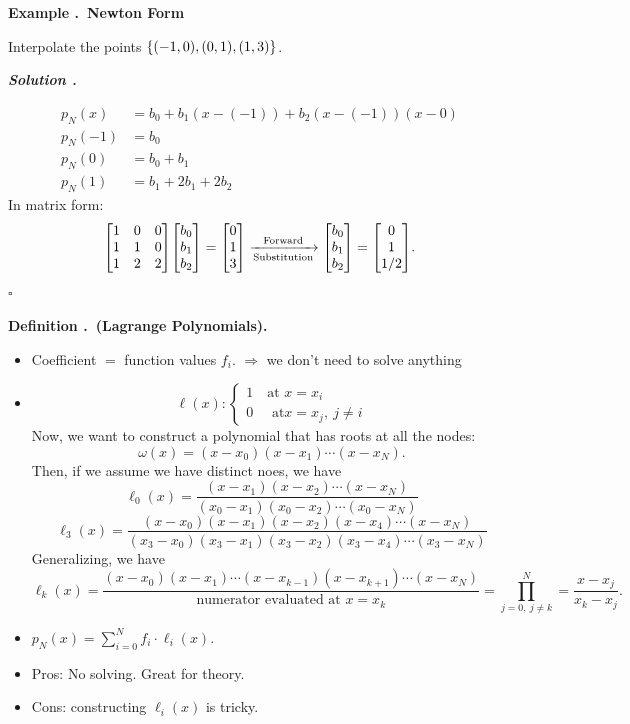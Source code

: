 \documentclass[12pt, a4paper]{article}
\newcounter{index}[subsection]
\newenvironment*{df}[1]{\par\noindent\textbf{Definition \thesubsection.\stepcounter{index}\theindex\ (#1).}}{\par}
\newenvironment*{eg}[1]{\begin{framed}\par\noindent\textbf{Example \thesubsection.\stepcounter{index}\theindex\ #1} \par}{\par\end{framed}}
\newcounter{nprf}[subsection]
\newenvironment*{sol}{\par\indent\textbf{\textit{Solution \stepcounter{nprf}\thenprf.}}\par}{\hfill{$\square$}\par}
\def\dsst{\displaystyle}
\def\l{\ell}
\begin{document}
\begin{eg}{Newton Form}
	Interpolate the points $\qty{(-1,0), (0,1), (1,3)}$.
	\begin{sol}
		\begin{align*}p_N(x)&=b_0+b_1(x-(-1))+b_2(x-(-1))(x-0)\\p_N(-1)&=b_0\\p_N(0)&=b_0+b_1\\p_N(1)&=b_1+2b_1+2b_2\end{align*} In matrix form: \[\mqty[1&0&0\\1&1&0\\1&2&2]\mqty[b_0\\b_1\\b_2]=\mqty[0\\1\\3]\xrightarrow[\text{Substitution}]{\text{Forward}}\mqty[b_0\\b_1\\b_2]=\mqty[0\\1\\1/2].\]
	\end{sol}
\end{eg}
\begin{df}{Lagrange Polynomials}
	\begin{itemize}
		\item Coefficient $=$ function values $f_i$. $\Longrightarrow$ we don't need to solve anything
		\item \[\l(x):\begin{cases}1\quad\text{at }x=x_i\\0\quad\text{ at}x=x_j,\ j\neq i\end{cases}\] Now, we want to construct a polynomial that has roots at all the nodes: \[\omega(x)=(x-x_0)(x-x_1)\cdots(x-x_N).\] Then, if we assume we have distinct noes, we have \[\l_0(x)=\dfrac{(x-x_1)(x-x_2)\cdots(x-x_N)}{(x_0-x_1)(x_0-x_2)\cdots(x_0-x_N)}\] \[\l_3(x)=\dfrac{(x-x_0)(x-x_1)(x-x_2)(x-x_4)\cdots(x-x_N)}{(x_3-x_0)(x_3-x_1)(x_3-x_2)(x_3-x_4)\cdots(x_3-x_N)}\] Generalizing, we have \[\l_k(x)=\dfrac{(x-x_0)(x-x_1)\cdots(x-x_{k-1})(x-x_{k+1})\cdots(x-x_N)}{\text{numerator evaluated at }x=x_k}=\prod_{j=0,\ j\neq k}^N=\dfrac{x-x_j}{x_k-x_j}.\]
		\item $\dsst p_N(x)=\sum_{i=0}^N f_i\cdot\l_i(x)$.
		\item Pros: No solving. Great for theory.
		\item Cons: constructing $\l_i(x)$ is tricky.
	\end{itemize}
\end{df}
\end{document}

